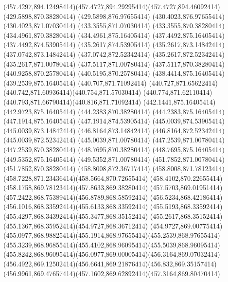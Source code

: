 {{	\curveto(457.4297,894.12498414)(457.4727,894.29295414)(457.4727,894.46092414)
	\closepath
	\moveto(429.5898,870.38280414)
	\lineto(429.5898,876.97655414)
	\lineto(430.4023,876.97655414)
	\lineto(430.4023,871.07030414)
	\lineto(433.3555,871.07030414)
	\lineto(433.3555,870.38280414)
	\closepath
	\moveto(434.4961,870.38280414)
	\lineto(434.4961,875.16405414)
	\lineto(437.4492,875.16405414)
	\lineto(437.4492,874.53905414)
	\lineto(435.2617,874.53905414)
	\lineto(435.2617,873.14842414)
	\lineto(437.0742,873.14842414)
	\lineto(437.0742,872.52342414)
	\lineto(435.2617,872.52342414)
	\lineto(435.2617,871.00780414)
	\lineto(437.5117,871.00780414)
	\lineto(437.5117,870.38280414)
	\closepath
	\moveto(440.9258,870.25780414)
	\lineto(440.5195,870.25780414)
	\lineto(438.4414,875.16405414)
	\lineto(439.2539,875.16405414)
	\lineto(440.707,871.71092414)
	\curveto(440.727,871.65622414)(440.742,871.60936414)(440.754,871.57030414)
	\curveto(440.774,871.62110414)(440.793,871.66790414)(440.816,871.71092414)
	\lineto(442.1441,875.16405414)
	\lineto(442.9723,875.16405414)
	\closepath
	\moveto(444.2383,870.38280414)
	\lineto(444.2383,875.16405414)
	\lineto(447.1914,875.16405414)
	\lineto(447.1914,874.53905414)
	\lineto(445.0039,874.53905414)
	\lineto(445.0039,873.14842414)
	\lineto(446.8164,873.14842414)
	\lineto(446.8164,872.52342414)
	\lineto(445.0039,872.52342414)
	\lineto(445.0039,871.00780414)
	\lineto(447.2539,871.00780414)
	\lineto(447.2539,870.38280414)
	\closepath
	\moveto(448.7695,870.38280414)
	\lineto(448.7695,875.16405414)
	\lineto(449.5352,875.16405414)
	\lineto(449.5352,871.00780414)
	\lineto(451.7852,871.00780414)
	\lineto(451.7852,870.38280414)
	\closepath
	\moveto(458.8008,872.36717414)
	\curveto(458.8008,871.78123414)(458.7228,871.23436414)(458.5664,870.72655414)
	\curveto(458.4102,870.22655414)(458.1758,869.78123414)(457.8633,869.38280414)
	\curveto(457.5703,869.01951414)(457.2422,868.75389414)(456.8789,868.58592414)
	\curveto(456.5234,868.42186414)(456.1016,868.33592414)(455.6133,868.33592414)
	\curveto(455.5193,868.33592414)(455.4297,868.34392414)(455.3477,868.35152414)
	\curveto(455.2617,868.35152414)(455.1367,868.35952414)(454.9727,868.36712414)
	\lineto(454.9727,869.00775414)
	\curveto(455.0977,868.98825414)(455.1914,868.97655414)(455.2539,868.97655414)
	\curveto(455.3239,868.96855414)(455.4102,868.96095414)(455.5039,868.96095414)
	\curveto(455.8242,868.96095414)(456.0977,869.00005414)(456.3164,869.07032414)
	\curveto(456.4922,869.12502414)(456.6641,869.21876414)(456.832,869.35157414)
	\curveto(456.9961,869.47657414)(457.1602,869.62892414)(457.3164,869.80470414)
}}
